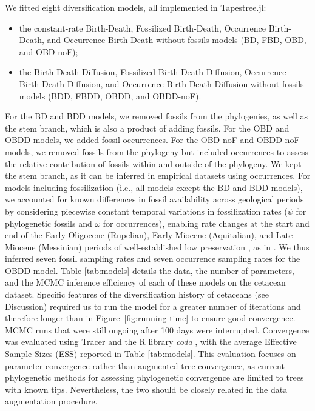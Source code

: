 \documentclass[oupdraft]{sysbio}
\begin{document}
We fitted eight diversification models, all implemented in Tapestree.jl:
\begin{itemize}
    \item the constant-rate Birth-Death, Fossilized Birth-Death, Occurrence Birth-Death, and Occurrence Birth-Death without fossils models (BD, FBD, OBD, and OBD-noF);
    \item the Birth-Death Diffusion, Fossilized Birth-Death Diffusion, Occurrence Birth-Death Diffusion, and Occurrence Birth-Death Diffusion without fossils models (BDD, FBDD, OBDD, and OBDD-noF).
\end{itemize}

For the BD and BDD models, we removed fossils from the phylogenies, as well as the stem branch, which is also a product of adding fossils. For the OBD and OBDD models, we added fossil occurrences. For the OBD-noF and OBDD-noF models, we removed fossils from the phylogeny but included occurrences to assess the relative contribution of fossils within and outside of the phylogeny. We kept the stem branch, as it can be inferred in empirical datasets using occurrences.
For models including fossilization (i.e., all models except the BD and BDD models), we accounted for known differences in fossil availability across geological periods by considering piecewise constant temporal variations in fossilization rates ($\psi$ for phylogenetic fossils and $\omega$ for occurrences), enabling rate changes at the start and end of the Early Oligocene (Rupelian), Early Miocene (Aquitalian), and Late Miocene (Messinian) periods of well-established low preservation \citep{marx_cetacean_2016, dominici_awkward_2020}, as in \citet{andreoletti_occurrence_2022}. We thus inferred seven fossil sampling rates and seven occurrence sampling rates for the OBDD model.
Table \ref{tab:models} details the data, the number of parameters, and the MCMC inference efficiency of each of these models on the cetacean dataset. Specific features of the diversification history of cetaceans (see Discussion) required us to run the model for a greater number of iterations and therefore longer than in Figure~\ref{fig:running-time} to ensure good convergence. MCMC runs that were still ongoing after 100 days were interrupted. Convergence was evaluated using Tracer \citep{rambaut_posterior_2018} and the R library \textit{coda} \citep{plummer_coda_2006}, with the average Effective Sample Sizes (ESS) reported in Table \ref{tab:models}. This evaluation focuses on parameter convergence rather than augmented tree convergence, as current phylogenetic methods for assessing phylogenetic convergence are limited to trees with known tips. Nevertheless, the two should be closely related in the data augmentation procedure.
\end{document}
